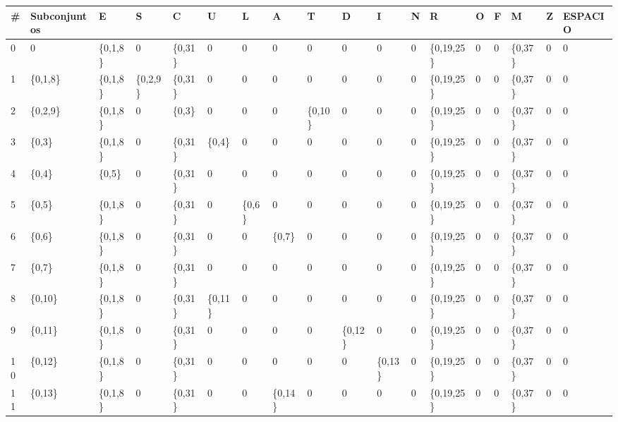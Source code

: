 \documentclass{article}
\begin{document}
        \begin{table}[!htbp]
            \centering
            \begin{adjustbox}{max width=\textwidth}
            \begin{tabular}{|l|l|l|l|l|l|l|l|l|l|l|l|l|l|l|l|l|l|}
            \hline
                \# & Subconjuntos & E & S & C & U & L & A & T & D & I & N & R & O & F & M & Z & ESPACIO \\ \hline
                0 & 0 & \{0,1,8\} & 0 & \{0,31\} & 0 & 0 & 0 & 0 & 0 & 0 & 0 & \{0,19,25\} & 0 & 0 & \{0,37\} & 0 & 0 \\ \hline
                1 & \{0,1,8\} & \{0,1,8\} & \{0,2,9\} & \{0,31\} & 0 & 0 & 0 & 0 & 0 & 0 & 0 & \{0,19,25\} & 0 & 0 & \{0,37\} & 0 & 0 \\ \hline
                2 & \{0,2,9\} & \{0,1,8\} & 0 & \{0,3\} & 0 & 0 & 0 & \{0,10\} & 0 & 0 & 0 & \{0,19,25\} & 0 & 0 & \{0,37\} & 0 & 0 \\ \hline
                3 & \{0,3\} & \{0,1,8\} & 0 & \{0,31\} & \{0,4\} & 0 & 0 & 0 & 0 & 0 & 0 & \{0,19,25\} & 0 & 0 & \{0,37\} & 0 & 0 \\ \hline
                4 & \{0,4\} & \{0,5\} & 0 & \{0,31\} & 0 & 0 & 0 & 0 & 0 & 0 & 0 & \{0,19,25\} & 0 & 0 & \{0,37\} & 0 & 0 \\ \hline
                5 & \{0,5\} & \{0,1,8\} & 0 & \{0,31\} & 0 & \{0,6\} & 0 & 0 & 0 & 0 & 0 & \{0,19,25\} & 0 & 0 & \{0,37\} & 0 & 0 \\ \hline
                6 & \{0,6\} & \{0,1,8\} & 0 & \{0,31\} & 0 & 0 & \{0,7\} & 0 & 0 & 0 & 0 & \{0,19,25\} & 0 & 0 & \{0,37\} & 0 & 0 \\ \hline
                7 & \{0,7\} & \{0,1,8\} & 0 & \{0,31\} & 0 & 0 & 0 & 0 & 0 & 0 & 0 & \{0,19,25\} & 0 & 0 & \{0,37\} & 0 & 0 \\ \hline
                8 & \{0,10\} & \{0,1,8\} & 0 & \{0,31\} & \{0,11\} & 0 & 0 & 0 & 0 & 0 & 0 & \{0,19,25\} & 0 & 0 & \{0,37\} & 0 & 0 \\ \hline
                9 & \{0,11\} & \{0,1,8\} & 0 & \{0,31\} & 0 & 0 & 0 & 0 & \{0,12\} & 0 & 0 & \{0,19,25\} & 0 & 0 & \{0,37\} & 0 & 0 \\ \hline
                10 & \{0,12\} & \{0,1,8\} & 0 & \{0,31\} & 0 & 0 & 0 & 0 & 0 & \{0,13\} & 0 & \{0,19,25\} & 0 & 0 & \{0,37\} & 0 & 0 \\ \hline
                11 & \{0,13\} & \{0,1,8\} & 0 & \{0,31\} & 0 & 0 & \{0,14\} & 0 & 0 & 0 & 0 & \{0,19,25\} & 0 & 0 & \{0,37\} & 0 & 0 \\ \hline

\end{tabular}
\end{adjustbox}
\end{table}
\end{document}
